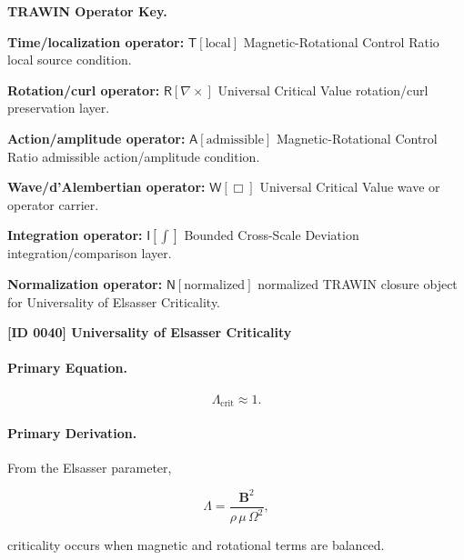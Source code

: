 \par\vspace{0.45\baselineskip}
\noindent\begin{minipage}[t]{\linewidth}
\begingroup
\small
\raggedright
\textbf{TRAWIN Operator Key.}\par
\noindent\textbf{Time/localization operator:} $\mathsf{T}\!\left[\mathrm{local}\right]$ Magnetic-Rotational Control Ratio local source condition.\par
\noindent\textbf{Rotation/curl operator:} $\mathsf{R}\!\left[\nabla\times\right]$ Universal Critical Value rotation/curl preservation layer.\par
\noindent\textbf{Action/amplitude operator:} $\mathsf{A}\!\left[\mathrm{admissible}\right]$ Magnetic-Rotational Control Ratio admissible action/amplitude condition.\par
\noindent\textbf{Wave/d'Alembertian operator:} $\mathsf{W}\!\left[\Box\right]$ Universal Critical Value wave or operator carrier.\par
\noindent\textbf{Integration operator:} $\mathsf{I}\!\left[\int\right]$ Bounded Cross-Scale Deviation integration/comparison layer.\par
\noindent\textbf{Normalization operator:} $\mathsf{N}\!\left[\mathrm{normalized}\right]$ normalized TRAWIN closure object for Universality of Elsasser Criticality.\par
\endgroup
\end{minipage}

\clearpage
\noindent\textbf{[ID 0040] Universality of Elsasser Criticality}\par
\vspace{0.35em}
\paragraph{Primary Equation.}
\begin{equation}
\Lambda_{\mathrm{crit}}\approx 1 .
\end{equation}

\paragraph{Primary Derivation.}
From the Elsasser parameter,

\begin{equation}
\Lambda
=
\frac{\mathbf{B}^2}
{\rho\,\mu\,\Omega^2},
\end{equation}

criticality occurs when magnetic and rotational terms are balanced.

